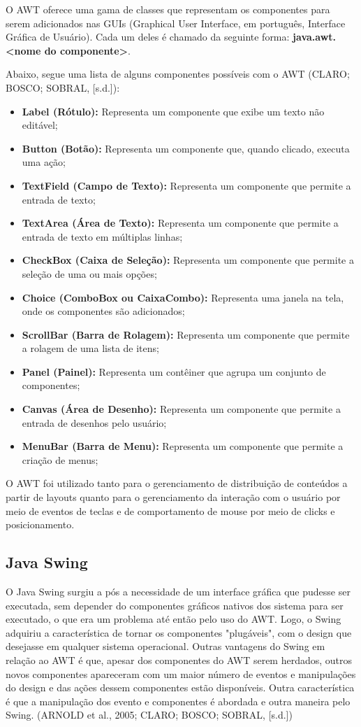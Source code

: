 \documentclass[a4paper,12pt]{article}
\begin{document}
O AWT oferece uma gama de classes que representam os componentes para serem adicionados nas GUIs (Graphical User Interface, em português, Interface Gráfica de Usuário). 
Cada um deles é chamado da seguinte forma: \textbf{java.awt.<nome do componente>}.

Abaixo, segue uma lista de alguns componentes possíveis com o AWT (CLARO; BOSCO; SOBRAL, [s.d.]):
\begin{itemize}
	\item \textbf{Label (Rótulo):} Representa um componente que exibe um texto não editável; 
	\item \textbf{Button (Botão):} Representa um componente que, quando clicado, executa uma ação; 
	\item \textbf{TextField (Campo de Texto):} Representa um componente que permite a entrada de texto; 
	\item \textbf{TextArea (Área de Texto):} Representa um componente que permite a entrada de texto em múltiplas linhas; 
	\item \textbf{CheckBox (Caixa de Seleção):} Representa um componente que permite a seleção de uma ou mais opções; 
	\item \textbf{Choice (ComboBox ou CaixaCombo):} Representa uma janela na tela, onde os componentes são adicionados; 
	\item \textbf{ScrollBar (Barra de Rolagem):} Representa um componente que permite a rolagem de uma lista de itens; 
	\item \textbf{Panel (Painel):} Representa um contêiner que agrupa um conjunto de componentes; 
	\item \textbf{Canvas (Área de Desenho):} Representa um componente que permite a entrada de desenhos pelo usuário; 
	\item \textbf{MenuBar (Barra de Menu):} Representa um componente que permite a criação de menus; 
\end{itemize}


O AWT foi utilizado tanto para o gerenciamento de distribuição de conteúdos a partir de layouts quanto para o gerenciamento 
da interação com o usuário por meio de eventos de teclas e de comportamento de mouse por meio de clicks e posicionamento.


\subsection{Java Swing}
O Java Swing surgiu a pós a necessidade de um interface gráfica que pudesse ser executada, sem depender do componentes gráficos 
nativos dos sistema para ser executado, o que era um problema até então pelo uso do AWT. Logo, o Swing adquiriu a característica 
de tornar os componentes "plugáveis", com o design que desejasse em qualquer sistema operacional. Outras vantagens do Swing em relação ao AWT é que,
apesar dos componentes do AWT serem herdados, outros novos componentes apareceram com um maior número de eventos e manipulações do design e das ações 
dessem componentes estão disponíveis. Outra característica é que a manipulação dos evento e componentes é abordada e outra maneira pelo Swing.
(ARNOLD et al., 2005; CLARO; BOSCO; SOBRAL, [s.d.])
\end{document}

